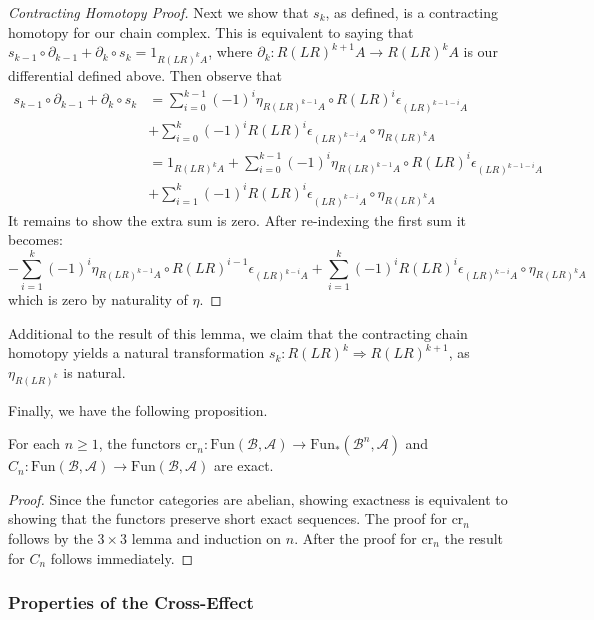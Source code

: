 \begin{proof}[Contracting Homotopy Proof]
    Next we show that $s_k$, as defined, is a contracting homotopy for our chain complex. This is equivalent to saying that $s_{k-1}\circ \partial_{k-1}+\partial_{k}\circ s_{k} = 1_{R(LR)^kA}$, where $\partial_k:R(LR)^{k+1}A\rightarrow R(LR)^kA$ is our differential defined above. Then observe that
    \begin{align*}
        s_{k-1}\circ \partial_{k-1}+\partial_{k}\circ s_{k} &= \sum_{i=0}^{k-1}(-1)^i\eta_{R(LR)^{k-1}A}\circ R(LR)^i\epsilon_{(LR)^{k-1-i}A} \\
        &+ \sum_{i=0}^k(-1)^iR(LR)^i\epsilon_{(LR)^{k-i}A}\circ \eta_{R(LR)^kA} \\
        &= 1_{R(LR)^kA}+\sum_{i=0}^{k-1}(-1)^i\eta_{R(LR)^{k-1}A}\circ R(LR)^i\epsilon_{(LR)^{k-1-i}A} \\
        &+ \sum_{i=1}^k(-1)^iR(LR)^i\epsilon_{(LR)^{k-i}A}\circ \eta_{R(LR)^kA} \tag{using the triangle identities} 
    \end{align*}
    It remains to show the extra sum is zero. After re-indexing the first sum it becomes:
    \begin{equation*}
        -\sum_{i=1}^{k}(-1)^i\eta_{R(LR)^{k-1}A}\circ R(LR)^{i-1}\epsilon_{(LR)^{k-i}A} + \sum_{i=1}^k(-1)^iR(LR)^i\epsilon_{(LR)^{k-i}A}\circ \eta_{R(LR)^kA}
    \end{equation*}
    which is zero by naturality of $\eta$.
\end{proof}

Additional to the result of this lemma, we claim that the contracting chain homotopy yields a natural transformation $s_k:R(LR)^k\Rightarrow R(LR)^{k+1}$, as $\eta_{R(LR)^k}$ is natural.

Finally, we have the following proposition.

\begin{prop}[label=prop:exactCross]
    For each $n \geq 1$, the functors $\text{cr}_n:\text{Fun}(\mathcal{B},\mathcal{A})\rightarrow \text{Fun}_*(\mathcal{B}^n,\mathcal{A})$ and $C_n:\text{Fun}(\mathcal{B},\mathcal{A})\rightarrow \text{Fun}(\mathcal{B},\mathcal{A})$ are exact.
\end{prop}
\begin{proof}
    Since the functor categories are abelian, showing exactness is equivalent to showing that the functors preserve short exact sequences. The proof for $\text{cr}_n$ follows by the $3\times 3$ lemma and induction on $n$. After the proof for $\text{cr}_n$ the result for $C_n$ follows immediately.
\end{proof}



\subsubsection{Properties of the Cross-Effect}

